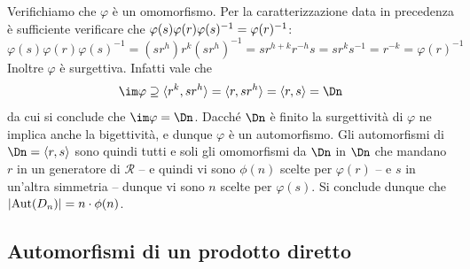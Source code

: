 \documentclass[11pt]{scrartcl}
\begin{document}
	
	Verifichiamo che $\varphi$ è un omomorfismo. Per la 
	caratterizzazione data in precedenza è sufficiente verificare che
	$\varphi(s)\varphi(r)\varphi(s)^{-1} = \nolinebreak\varphi(r)^{-1}$:
	\[
	\varphi(s)\varphi(r)\varphi(s)^{-1} = (sr^h)r^k(sr^h)^{-1} = sr^{h + k}r^{-h}s =
	sr^k s^{-1} = r^{-k} = \varphi(r)^{-1}
	\]
	Inoltre $\varphi$ è surgettiva. Infatti vale che
	\[
	\im \varphi \supseteq \langle r^k, sr^h \rangle = \langle r, sr^h \rangle = \langle r, s \rangle =
	\Dn
	\]
	da cui si conclude che $\im \varphi = \Dn$. Dacché $\Dn$ è finito la surgettività di $\varphi$ ne implica anche la bigettività, e dunque $\varphi$
	è un automorfismo. Gli automorfismi di $\Dn = \langle r, s\rangle$ sono quindi
	tutti e soli gli omomorfismi da $\Dn$ in $\Dn$ che mandano $r$ in un generatore
	di $\mathcal{R}$ -- e quindi vi sono $\phi(n)$ scelte per $\varphi(r)$ -- e $s$ in un'altra simmetria -- dunque vi sono $n$ scelte per $\varphi(s)$. Si conclude dunque che
	$\lvert \operatorname{Aut}(D_n) \rvert = n \cdot \phi(n)$.
	
	\newpage
	
	\subsection{Automorfismi di un prodotto diretto}
	
\end{document}
